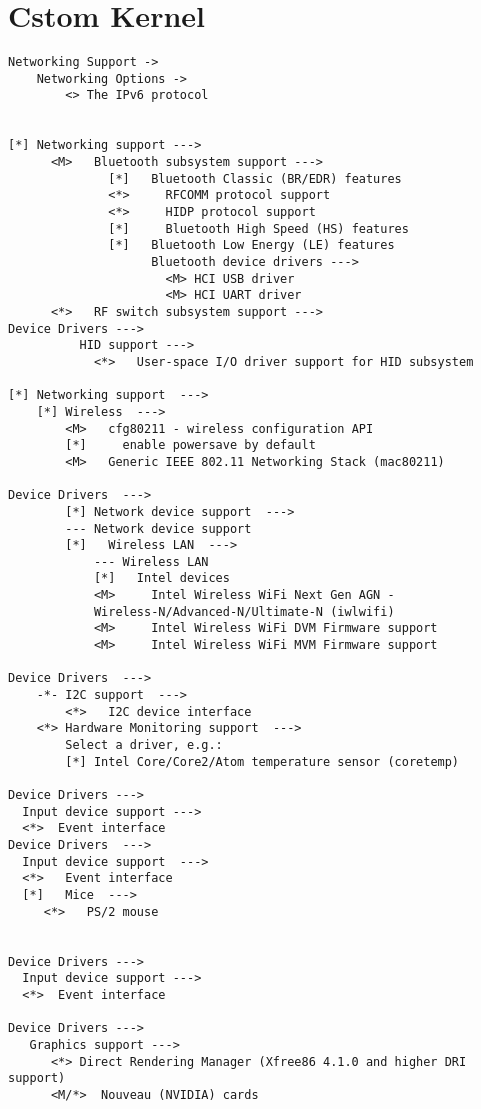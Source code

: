 \documentclass[10pt, a4paper, onecolumn, openany]{book}         %
\begin{document}
\chapter{Cstom Kernel}
\begin{Verbatim}[commandchars=\\\{\}]
Networking Support -> 
    Networking Options ->
        <> The IPv6 protocol


[*] Networking support --->
      <M>   Bluetooth subsystem support --->
              [*]   Bluetooth Classic (BR/EDR) features
              <*>     RFCOMM protocol support
              <*>     HIDP protocol support
              [*]     Bluetooth High Speed (HS) features
              [*]   Bluetooth Low Energy (LE) features
                    Bluetooth device drivers --->
                      <M> HCI USB driver
                      <M> HCI UART driver
      <*>   RF switch subsystem support --->
Device Drivers --->
          HID support --->
            <*>   User-space I/O driver support for HID subsystem

[*] Networking support  --->
    [*] Wireless  --->
        <M>   cfg80211 - wireless configuration API
        [*]     enable powersave by default
        <M>   Generic IEEE 802.11 Networking Stack (mac80211)

Device Drivers  --->
        [*] Network device support  --->
        --- Network device support
        [*]   Wireless LAN  --->
            --- Wireless LAN
            [*]   Intel devices
            <M>     Intel Wireless WiFi Next Gen AGN - 
            Wireless-N/Advanced-N/Ultimate-N (iwlwifi)
            <M>     Intel Wireless WiFi DVM Firmware support
            <M>     Intel Wireless WiFi MVM Firmware support

Device Drivers  --->
    -*- I2C support  --->
        <*>   I2C device interface
    <*> Hardware Monitoring support  --->
        Select a driver, e.g.:
        [*] Intel Core/Core2/Atom temperature sensor (coretemp)   
        
Device Drivers --->
  Input device support --->
  <*>  Event interface
Device Drivers  --->
  Input device support  --->
  <*>   Event interface
  [*]   Mice  --->
     <*>   PS/2 mouse   


Device Drivers --->
  Input device support --->
  <*>  Event interface
  
Device Drivers --->
   Graphics support --->
      <*> Direct Rendering Manager (Xfree86 4.1.0 and higher DRI support)
      <M/*>  Nouveau (NVIDIA) cards     
      

\end{Verbatim}
\end{document}
